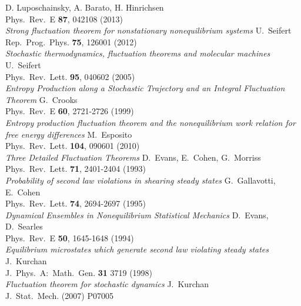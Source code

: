 \newcommand\PRL[1]{Phys.~Rev.~Lett. \textbf{#1}}
\newcommand\PRE[1]{Phys.~Rev.~E \textbf{#1}}
\newcommand\JSP[1]{J.~Stat.~Phys. \textbf{#1}}

\begin{thebibliography}{99}
	 {
		D. Luposchainsky, A. Barato, H. Hinrichsen \\
		\PRE{87}, 042108 (2013) \\
		\emph{Strong fluctuation theorem for nonstationary nonequilibrium systems}
		}
	 {
		U.~Seifert \\
		Rep.~Prog.~Phys. \textbf{75}, 126001 (2012) \\
		\emph{Stochastic thermodynamics, fluctuation theorems and molecular machines}
		}
	 {
		U.~Seifert \\
		\PRL{95}, 040602 (2005) \\
		\emph{Entropy Production along a Stochastic Trajectory and an Integral Fluctuation Theorem}
		}
	 {
		G.~Crooks \\
		\PRE{60}, 2721-2726 (1999) \\
		\emph{Entropy production fluctuation theorem and the nonequilibrium work relation for free energy differences}
		}
	 {
		M.~Esposito \\
		\PRL{104}, 090601 (2010) \\
		\emph{Three Detailed Fluctuation Theorems}
		}
	 {
		D.~Evans, E.~Cohen, G.~Morriss \\
		\PRL{71}, 2401-2404 (1993) \\
		\emph{Probability of second law violations in shearing steady states}
		}
	 {
		G.~Gallavotti, E.~Cohen \\
		\PRL{74}, 2694-2697 (1995) \\
		\emph{Dynamical Ensembles in Nonequilibrium Statistical Mechanics}
		}
	 {
		D.~Evans, D.~Searles \\
		\PRE{50}, 1645-1648 (1994) \\
		\emph{Equilibrium microstates which generate second law violating steady states}
		}
	 {
		J.~Kurchan \\
		J.~Phys.~A:~Math.~Gen. \textbf{31} 3719 (1998) \\
		\emph{Fluctuation theorem for stochastic dynamics}
		}
	 {
		J.~Kurchan \\
		J.~Stat.~Mech. (2007) P07005 \\
}
\end{thebibliography}
